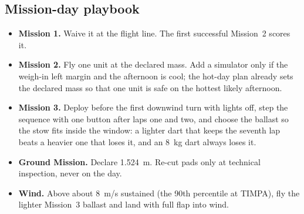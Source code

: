 \subsection{Mission-day playbook}
\begin{itemize}
\item \textbf{Mission 1.} Waive it at the flight line. The first successful Mission~2 scores it.
\item \textbf{Mission 2.} Fly one unit at the declared mass. Add a simulator only if the weigh-in left margin and the afternoon is cool; the hot-day plan already sets the declared mass so that one unit is safe on the hottest likely afternoon.
\item \textbf{Mission 3.} Deploy before the first downwind turn with lights off, step the sequence with one button after laps one and two, and choose the ballast so the stow fits inside the window: a lighter dart that keeps the seventh lap beats a heavier one that loses it, and an 8~kg dart always loses it.
\item \textbf{Ground Mission.} Declare 1.524~m. Re-cut pads only at technical inspection, never on the day.
\item \textbf{Wind.} Above about 8~m/s sustained (the 90th percentile at TIMPA), fly the lighter Mission~3 ballast and land with full flap into wind.
\end{itemize}
